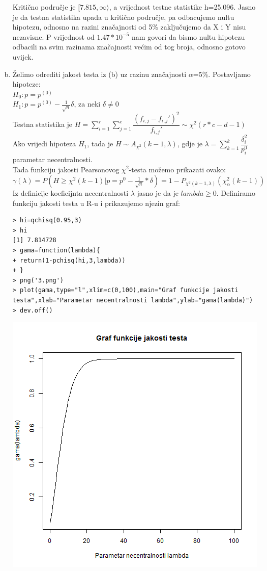 \documentclass[11pt]{article}
\begin{document}
\begin{enumerate}[(a)]
Kritično područje je $[7.815,\infty\rangle$, a vrijednost testne statistike h=25.096. Jasno je da testna statistika upada u kritično područje, pa odbacujemo nultu hipotezu, odnosno na razini značajnosti od 5\% zaključujemo da X i Y nisu nezavisne. P vrijednost od $1.47*10^{-5}$ nam govori da bismo nultu hipotezu odbacili na svim razinama značajnosti većim od tog broja, odnosno gotovo uvijek.\\

\item Želimo odrediti jakost testa iz (b) uz razinu značajnosti $\alpha$=5\%. Postavljamo hipoteze:\\
$H_{0}: p=p^{(0)}$\\
$H_{1}: p=p^{(0)} - \frac{1}{\sqrt{n}} \delta$, za neki $\delta\neq 0$\\
Testna statistika je $H=\sum_{i=1}^{r} \sum_{j=1}^{c} \dfrac{(f_{i,j}-f_{i,j}')^2}{f_{i,j}'} \sim \chi^2(r*c-d-1)$\\
Ako vrijedi hipoteza $H_{1}$, tada je $H\sim A_{\chi^2} (k-1,\lambda)$, gdje je $\lambda=\sum_{k=1}^k \dfrac{\delta_{i}^2}{p_{i}^0}$ parametar
necentralnosti.\\
Tada funkciju jakosti Pearsonovog $\chi^2$-testa možemo prikazati ovako:\\
$\gamma(\lambda)=P(H\geq \chi^2(k-1)|p=p^0-\frac{1}{\sqrt{n}}*\delta)=1-P_{\chi^2(k-1,\lambda)}(\chi_{\alpha}^2 (k-1))$\\
Iz definicije koeficijnta necentralnosti $\lambda$ jasno je da je $lambda \geq 0$. Definiramo funkciju jakosti testa u R-u i prikazujemo njezin graf:\\
\begin{verbatim}
> hi=qchisq(0.95,3)
> hi
[1] 7.814728
> gama=function(lambda){
+ return(1-pchisq(hi,3,lambda))
+ }
> png('3.png')
> plot(gama,type="l",xlim=c(0,100),main="Graf funkcije jakosti 
testa",xlab="Parametar necentralnosti lambda",ylab="gama(lambda)")
> dev.off()
\end{verbatim}
\includegraphics[scale=0.45]{3.png}\\

\end{enumerate}
\end{document}

